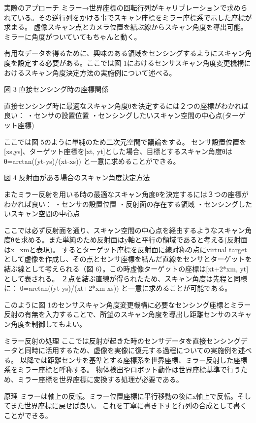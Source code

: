 \documentclass[xelatex,ja=standard]{bxjsarticle}
\begin{document}
実際のアプローチ
ミラー→世界座標の回転行列がキャリブレーションで求められている。その逆行列をかける事でスキャン座標をミラー座標系で示した座標が求まる。
虚像スキャン点とカメラ位置を結ぶ線からスキャン角度を導出可能。
ミラーに角度がついていてもちゃんと動く。


有用なデータを得るために、興味のある領域をセンシングするようにスキャン角度を設定する必要がある。ここでは図 1におけるセンサスキャン角度変更機構におけるスキャン角度決定方法の実施例について述べる。

 
図 3 直接センシング時の座標関係

直接センシング時に最適なスキャン角度θを決定するには２つの座標がわかれば良い：
・センサの設置位置
・センシングしたいスキャン空間の中心点(ターゲット座標)

ここでは図 5のように単純のため二次元空間で議論をする。
センサ設置位置を[xs,ys]、ターゲット座標を[xt, yt]とした場合、目標とするスキャン角度θは
θ=arctan⁡((yt-ys)/(xt-xs))
と一意に求めることができる。

 
図 4 反射面がある場合のスキャン角度決定方法

またミラー反射を用いる時の最適なスキャン角度θを決定するには３つの座標がわかれば良い：
・センサの設置位置
・反射面の存在する領域
・センシングしたいスキャン空間の中心点

ここでは必ず反射面を通り、スキャン空間の中心点を経由するようなスキャン角度θを求める。また単純のため反射面はy軸と平行の領域であると考える(反射面はx=xmと表現)。
するとターゲット座標を反射面に線対称の点にvirtual targetとして虚像を作成し、その点とセンサ座標を結んだ直線をセンサとターゲットを結ぶ線として考えられる（図 6）。この時虚像ターゲットの座標は[xt+2*xm, yt]として表される。
２点を結ぶ直線が得られたため、スキャン角度は先程と同様に：
θ=arctan⁡((yt-ys)/(xt+2*xm-xs))
と一意に求めることが可能である。

このように図 1のセンサスキャン角度変更機構に必要なセンシング座標とミラー反射の有無を入力することで、所望のスキャン角度を導出し距離センサのスキャン角度を制御してもよい。

	ミラー反射の処理
ここでは反射が起きた時のセンサデータを直接センシングデータと同時に活用するため、虚像を実像に復元する過程についての実施例を述べる。
以降では距離センサを基準とする座標系を世界座標、ミラー反射した座標系をミラー座標と呼称する。
物体検出やロボット動作は世界座標基準で行うため、ミラー座標を世界座標に変換する処理が必要である。

原理
ミラーは軸上の反転。ミラー位置座標に平行移動の後にx軸上で反転。そしてまた世界座標に戻せば良い。
これを丁寧に書き下すと行列の合成として書くことができる。
\end{document}
